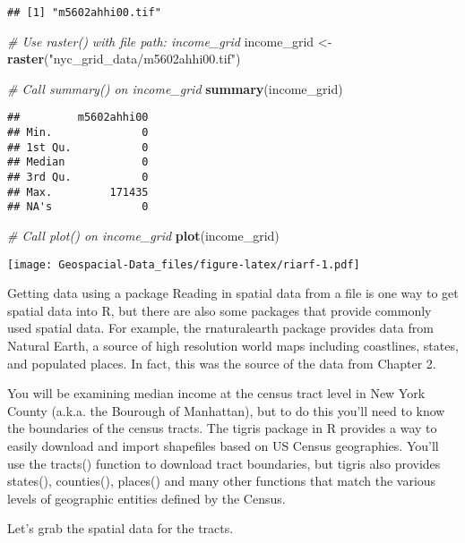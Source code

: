 \documentclass[]{article}
\newenvironment{Shaded}{\begin{snugshade}}{\end{snugshade}}
\newcommand{\CommentTok}[1]{\textcolor[rgb]{0.56,0.35,0.01}{\textit{#1}}}
\newcommand{\KeywordTok}[1]{\textcolor[rgb]{0.13,0.29,0.53}{\textbf{#1}}}
\newcommand{\NormalTok}[1]{#1}
\newcommand{\StringTok}[1]{\textcolor[rgb]{0.31,0.60,0.02}{#1}}
\begin{document}
\begin{verbatim}
## [1] "m5602ahhi00.tif"
\end{verbatim}

\begin{Shaded}
\begin{Highlighting}[]
\CommentTok{# Use raster() with file path: income_grid}
\NormalTok{income_grid <-}\StringTok{ }\KeywordTok{raster}\NormalTok{(}\StringTok{"nyc_grid_data/m5602ahhi00.tif"}\NormalTok{)}

\CommentTok{# Call summary() on income_grid}
\KeywordTok{summary}\NormalTok{(income_grid)}
\end{Highlighting}
\end{Shaded}

\begin{verbatim}
##         m5602ahhi00
## Min.              0
## 1st Qu.           0
## Median            0
## 3rd Qu.           0
## Max.         171435
## NA's              0
\end{verbatim}

\begin{Shaded}
\begin{Highlighting}[]
\CommentTok{# Call plot() on income_grid}
\KeywordTok{plot}\NormalTok{(income_grid)}
\end{Highlighting}
\end{Shaded}

\texttt{[image: Geospacial-Data\_files/figure-latex/riarf-1.pdf]}

Getting data using a package Reading in spatial data from a file is one
way to get spatial data into R, but there are also some packages that
provide commonly used spatial data. For example, the rnaturalearth
package provides data from Natural Earth, a source of high resolution
world maps including coastlines, states, and populated places. In fact,
this was the source of the data from Chapter 2.

You will be examining median income at the census tract level in New
York County (a.k.a. the Bourough of Manhattan), but to do this you'll
need to know the boundaries of the census tracts. The tigris package in
R provides a way to easily download and import shapefiles based on US
Census geographies. You'll use the tracts() function to download tract
boundaries, but tigris also provides states(), counties(), places() and
many other functions that match the various levels of geographic
entities defined by the Census.

Let's grab the spatial data for the tracts.
\end{document}
